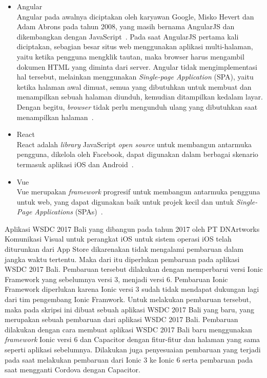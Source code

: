 \begin{itemize}
	\item Angular \\
	Angular pada awalnya diciptakan oleh karyawan Google, Misko Hevert dan Adam Abrons pada tahun 2008, yang masih bernama AngularJS dan dikembangkan dengan JavaScript~\cite{wohlgethan:18:supporting}. Pada saat AngularJS pertama kali diciptakan, sebagian besar situs web menggunakan aplikasi multi-halaman, yaitu ketika pengguna mengklik tautan, maka browser harus mengambil dokumen HTML yang diminta dari server. Angular tidak mengimplementasi hal tersebut, melainkan menggunakan \textit{Single-page Application} (SPA), yaitu ketika halaman awal dimuat, semua yang dibutuhkan untuk membuat dan menampilkan sebuah halaman diunduh, kemudian ditampilkan kedalam layar. Dengan begitu, \textit{browser} tidak perlu  mengunduh ulang yang dibutuhkan saat menampilkan halaman~\cite{scott:15:spa}.
	
	\item React \\
	React adalah \textit{library} JavaScript {\it open source} untuk membangun antarmuka pengguna, dikelola oleh Facebook, dapat digunakan dalam berbagai skenario termasuk aplikasi iOS dan Android~\cite{wohlgethan:18:supporting}.
	
	\item Vue \\
	 Vue merupakan \textit{framework} progresif untuk membangun antarmuka pengguna untuk web, yang dapat digunakan baik untuk projek kecil dan untuk {\it Single-Page Applications} (SPAs)~\cite{wohlgethan:18:supporting}.
\end{itemize}

Aplikasi WSDC 2017 Bali yang dibangun pada tahun 2017 oleh PT DNArtworks Komunikasi Visual untuk perangkat iOS untuk sistem operasi iOS telah diturunkan dari App Store dikarenakan tidak mengalami pembaruan dalam jangka waktu tertentu. Maka dari itu diperlukan pembaruan pada aplikasi WSDC 2017 Bali. Pembaruan tersebut dilakukan dengan memperbarui versi Ionic Framework yang sebelumnya versi 3, menjadi versi 6. Pembaruan Ionic Framework diperlukan karena Ionic versi 3 sudah tidak mendapat dukungan lagi dari tim pengembang Ionic Framwork. Untuk melakukan pembaruan tersebut, maka pada skripsi ini dibuat sebuah aplikasi WSDC 2017 Bali yang baru, yang merupakan sebuah pembaruan dari aplikasi WSDC 2017 Bali. Pembaruan dilakukan dengan cara membuat aplikasi WSDC 2017 Bali baru menggunakan \textit{framework} Ionic versi 6 dan Capacitor dengan fitur-fitur dan halaman yang sama seperti aplikasi sebelumnya. Dilakukan juga penyesuaian pembaruan yang terjadi pada saat melakukan pembaruan dari Ionic 3 ke Ionic 6 serta pembaruan pada saat mengganti Cordova dengan Capacitor. 

